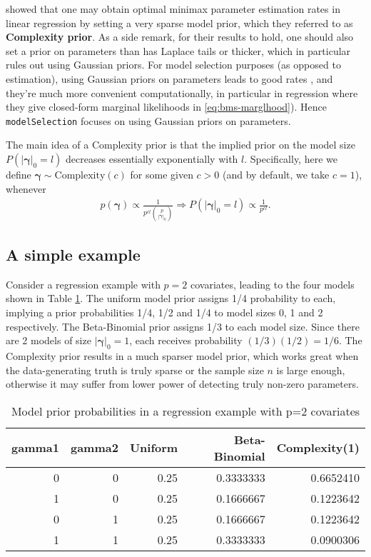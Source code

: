 \documentclass[
]{book}
\newcommand{\bgamma}{\mathbf{\gamma}}
\theoremstyle{definition}
\theoremstyle{definition}
\theoremstyle{definition}
\theoremstyle{definition}
\theoremstyle{remark}
\begin{document}
\citet{castillo:2015} showed that one may obtain optimal minimax parameter estimation rates in linear regression by setting a very sparse model prior, which they referred to as \textbf{Complexity prior}. As a side remark, for their results to hold, one should also set a prior on parameters than has Laplace tails or thicker, which in particular rules out using Gaussian priors. For model selection purposes (as opposed to estimation), using Gaussian priors on parameters leads to good rates \citep{rossell:2022}, and they're much more convenient computationally, in particular in regression where they give closed-form marginal likelihoods in \eqref{eq:bms-marglhood}).
Hence \texttt{modelSelection} focuses on using Gaussian priors on parameters.

The main idea of a Complexity prior is that the implied prior on the model size \(P(|\bgamma|_0= l)\) decreases essentially exponentially with \(l\).
Specifically, here we define \(\bgamma \sim \mbox{Complexity}(c)\) for some given \(c > 0\) (and by default, we take \(c=1\)), whenever
\begin{align}
p(\bgamma) \propto \frac{1}{p^{c l} {p \choose |\bgamma|_0}}
\Longrightarrow
P(|\bgamma|_0= l) \propto \frac{1}{p^{c l}}.
\label{eq:bms-complexprior}
\end{align}

\subsection{A simple example}\label{a-simple-example}

Consider a regression example with \(p=2\) covariates, leading to the four models shown in Table \ref{tab:tabmodelprior}. The uniform model prior assigns 1/4 probability to each, implying a prior probabilities 1/4, 1/2 and 1/4 to model sizes 0, 1 and 2 respectively.
The Beta-Binomial prior assigns 1/3 to each model size. Since there are 2 models of size \(|\bgamma|_0=1\), each receives probability \((1/3) (1/2)= 1/6\).
The Complexity prior results in a much sparser model prior, which works great when the data-generating truth is truly sparse or the sample size \(n\) is large enough, otherwise it may suffer from lower power of detecting truly non-zero parameters.

\begin{table}

\caption{\label{tab:tabmodelprior}Model prior probabilities in a regression example with p=2 covariates}
\centering
\begin{tabular}[t]{rrrrr}
\toprule
gamma1 & gamma2 & Uniform & Beta-Binomial & Complexity(1)\\
\midrule
0 & 0 & 0.25 & 0.3333333 & 0.6652410\\
1 & 0 & 0.25 & 0.1666667 & 0.1223642\\
0 & 1 & 0.25 & 0.1666667 & 0.1223642\\
1 & 1 & 0.25 & 0.3333333 & 0.0900306\\
\bottomrule
\end{tabular}
\end{table}
\end{document}
